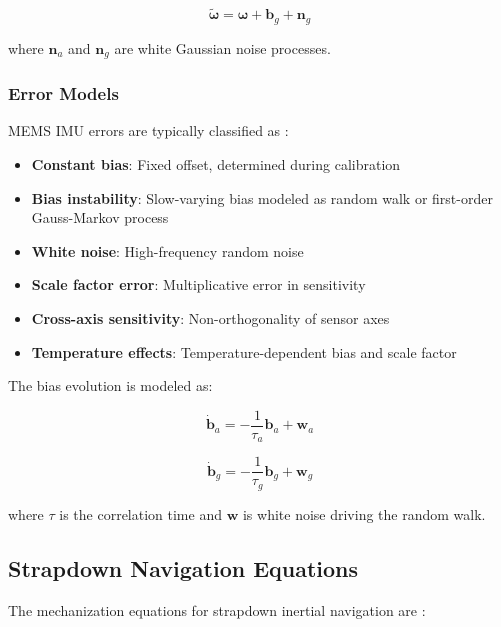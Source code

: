 \documentclass[12pt,a4paper]{article}
\begin{document}
\begin{equation}
\tilde{\boldsymbol{\omega}} = \boldsymbol{\omega} + \mathbf{b}_g + \mathbf{n}_g
\end{equation}

where $\mathbf{n}_a$ and $\mathbf{n}_g$ are white Gaussian noise processes.

\subsubsection{Error Models}

MEMS IMU errors are typically classified as \cite{aggarwal2013comparison}:

\begin{itemize}
    \item \textbf{Constant bias}: Fixed offset, determined during calibration
    \item \textbf{Bias instability}: Slow-varying bias modeled as random walk or first-order Gauss-Markov process
    \item \textbf{White noise}: High-frequency random noise
    \item \textbf{Scale factor error}: Multiplicative error in sensitivity
    \item \textbf{Cross-axis sensitivity}: Non-orthogonality of sensor axes
    \item \textbf{Temperature effects}: Temperature-dependent bias and scale factor
\end{itemize}

The bias evolution is modeled as:

\begin{equation}
\dot{\mathbf{b}}_a = -\frac{1}{\tau_a}\mathbf{b}_a + \mathbf{w}_a
\end{equation}

\begin{equation}
\dot{\mathbf{b}}_g = -\frac{1}{\tau_g}\mathbf{b}_g + \mathbf{w}_g
\end{equation}

where $\tau$ is the correlation time and $\mathbf{w}$ is white noise driving the random walk.

\subsection{Strapdown Navigation Equations}

The mechanization equations for strapdown inertial navigation are \cite{savage1998strapdown, titterton2004strapdown}:
\end{document}
